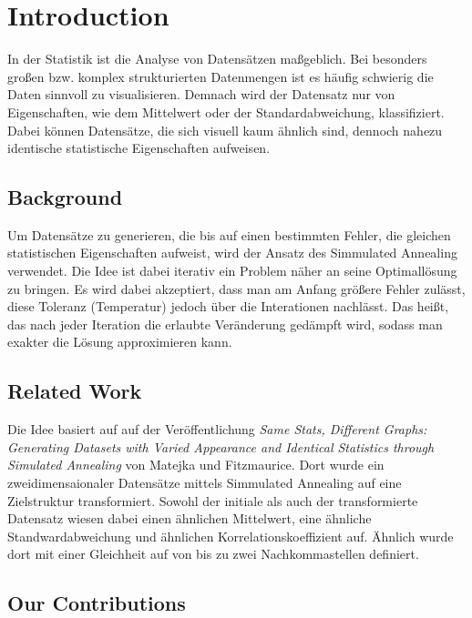 \documentclass[sigconf]{acmart}
\begin{document}
\let\thefootnote\relax{}


\section{Introduction}

In der Statistik ist die Analyse von Datensätzen maßgeblich. Bei besonders großen bzw. komplex strukturierten Datenmengen ist es häufig schwierig die Daten sinnvoll zu visualisieren. Demnach wird der Datensatz nur von Eigenschaften, wie dem Mittelwert oder der Standardabweichung, klassifiziert. Dabei können Datensätze, die sich visuell kaum ähnlich sind, dennoch nahezu identische statistische Eigenschaften aufweisen. 

\subsection{Background}

Um Datensätze zu generieren, die bis auf einen bestimmten Fehler, die gleichen statistischen Eigenschaften aufweist, wird der Ansatz des Simmulated Annealing verwendet. Die Idee ist dabei iterativ ein Problem näher an seine Optimallösung zu bringen. Es wird dabei akzeptiert, dass man am Anfang größere Fehler zulässt, diese Toleranz (Temperatur) jedoch über die Interationen nachlässt. Das heißt, das nach jeder Iteration die erlaubte Veränderung gedämpft wird, sodass man exakter die Lösung approximieren kann.

\subsection{Related Work}

Die Idee basiert auf auf der Veröffentlichung \textit{Same Stats, Different Graphs: Generating Datasets with Varied Appearance and Identical Statistics through Simulated Annealing} von Matejka und Fitzmaurice. Dort wurde ein zweidimensaionaler Datensätze mittels Simmulated Annealing auf eine Zielstruktur transformiert. Sowohl der initiale als auch der transformierte Datensatz wiesen dabei einen ähnlichen Mittelwert, eine ähnliche Standwardabweichung und ähnlichen Korrelationskoeffizient auf. Ähnlich wurde dort mit einer Gleichheit auf von bis zu zwei Nachkommastellen definiert.

\subsection{Our Contributions}
\end{document}
